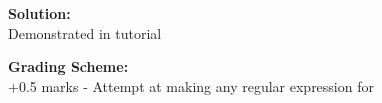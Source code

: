 \documentclass[11pt, article, oneside]{memoir}
\begin{document}
\begin{enumerate}
        \textbf{Solution:}
        \\Demonstrated in tutorial

        \textbf{Grading Scheme:}
        \\+0.5 marks - Attempt at making any regular expression for
        
\end{enumerate}
\end{document}
